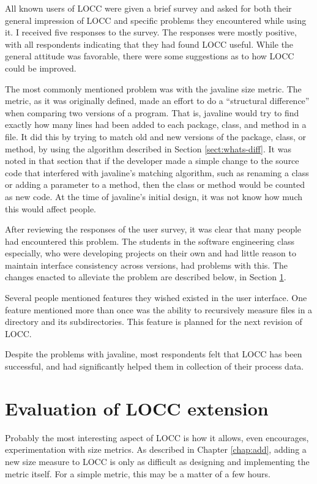 All known users of LOCC were given a brief survey and asked for both
their general impression of LOCC and specific problems they
encountered while using it.  I received five responses to the survey.
The responses were mostly positive, with all respondents indicating that
they had found LOCC useful.  While the general attitude was favorable,
there were some suggestions as to how LOCC could be improved.

The most commonly mentioned problem was with the {\sc javaline} size
metric.  The metric, as it was originally defined, made an effort to
do a ``structural difference'' when comparing two versions of a
program.  That is, {\sc javaline} would try to find exactly how many
lines had been added to each package, class, and method in a file.  It 
did this by trying to match old and new versions of the package,
class, or method, by using the algorithm described in Section
\ref{sect:whats-diff}.  It was noted in that section that if the developer
made a simple change to the source code that interfered with {\sc
  javaline\/}'s matching algorithm, such as renaming a class or adding 
a parameter to a method, then the class or method would be counted as
new code.  At the time of {\sc javaline\/}'s initial design, it was
not know how much this would affect people.

After reviewing the responses of the user survey, it was clear that
many people had encountered this problem.  The students in the
software engineering class especially, who were developing projects on 
their own and had little reason to maintain interface consistency
across versions, had problems with this.  The changes enacted to
alleviate the problem are described below, in Section \ref{eval:add}.

Several people mentioned features they wished existed in the user
interface.  One feature mentioned more than once was the ability to
recursively measure files in a directory and its subdirectories.  This 
feature is planned for the next revision of LOCC.

Despite the problems with {\sc javaline}, most respondents felt that
LOCC has been successful, and had significantly helped them in
collection of their process data.

\section{Evaluation of LOCC extension}
\label{eval:add}

Probably the most interesting aspect of LOCC is how it allows, even
encourages, experimentation with size metrics.  As described in
Chapter \ref{chap:add}, adding a new size measure to LOCC is only as
difficult as designing and implementing the metric itself.  For a
simple metric, this may be a matter of a few hours.  

